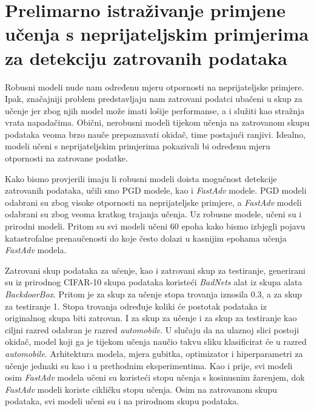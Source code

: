 \documentclass[times, utf8, zavrsni, numeric]{fer}
\begin{document}


\section{Prelimarno istraživanje primjene učenja s neprijateljskim primjerima za detekciju zatrovanih podataka}

Robusni modeli nude nam određenu mjeru otpornosti na neprijateljske primjere. 
Ipak, značajniji problem predstavljaju nam zatrovani podatci ubačeni u skup za učenje jer zbog njih model može imati lošije performanse, a i služiti kao stražnja vrata napadačima.
Obični, nerobusni modeli tijekom učenja na zatrovanom skupu podataka veoma brzo nauče prepoznavati okidač, time postajući ranjivi.
Idealno, modeli učeni s neprijateljskim primjerima pokazivali bi određenu mjeru otpornosti na zatrovane podatke.

Kako bismo provjerili imaju li robusni modeli doista mogućnost detekcije zatrovanih podataka,
učili smo PGD modele, kao i \textit{FastAdv} modele. PGD modeli odabrani su zbog visoke otpornosti na neprijateljske primjere,
a \textit{FastAdv} modeli odabrani su zbog veoma kratkog trajanja učenja. Uz robusne modele, učeni su i prirodni modeli.
Pritom su svi modeli učeni 60 epoha kako bismo izbjegli pojavu katastrofalne prenaučenosti do koje često dolazi u kasnijim epohama učenja \textit{FastAdv} modela. 

\pagebreak

Zatrovani skup podataka za učenje, kao i zatrovani skup za testiranje, generirani su iz prirodnog CIFAR-10 skupa podataka koristeći \textit{BadNets} 
alat iz skupa alata \textit{BackdoorBox}. Pritom je za skup za učenje stopa trovanja iznosila 0.3, a za skup za testiranje 1. Stopa trovanja određuje koliki će postotak podataka iz originalnog skupa biti zatrovan.
I za skup za učenje i za skup za testiranje kao ciljni razred odabran je razred \textit{automobile}. 
U slučaju da na ulaznoj slici postoji okidač, model koji ga je tijekom učenja naučio takvu sliku klasificirat će u razred \textit{automobile}.
Arhitektura modela, mjera gubitka, optimizator i hiperparametri za učenje jednaki su kao i u prethodnim eksperimentima. 
Kao i prije, svi modeli osim \textit{FastAdv} modela učeni su koristeći stopu učenja s kosinusnim žarenjem, dok \textit{FastAdv} modeli koriste cikličku stopu učenja.
Osim na zatrovanom skupu podataka, svi modeli učeni su i na prirodnom skupu podataka.
\end{document}
